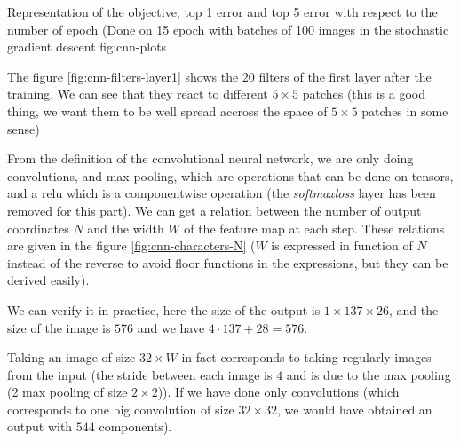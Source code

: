 \documentclass{article}
\begin{document}
\triplefign
{}
{}
{}
{Representation of the objective, top 1 error and top 5 error with
  respect to the number of epoch (Done on 15 epoch with batches of 100
  images in the stochastic gradient descent} {fig:cnn-plots}

\newpage
{}

The figure \ref{fig:cnn-filters-layer1} shows the $20$ filters of the
first layer after the training. We can see that they react to
different $5 \times 5$ patches (this is a good thing, we want them to
be well spread accross the space of $5 \times 5$ patches in some
sense)




From the definition of the convolutional neural network, we are only
doing convolutions, and max pooling, which are operations that can be
done on tensors, and a relu which is a componentwise operation (the
\emph{softmaxloss} layer has been removed for this part). We can get a
relation between the number of output coordinates $N$ and the width
$W$ of the feature map at each step. These relations are given in the
figure \ref{fig:cnn-characters-N} ($W$ is expressed in function of $N$
instead of the reverse to avoid floor functions in the expressions,
but they can be derived easily).

We can verify it in practice, here the size of the output is
$1 \times 137 \times 26$, and the size of the image is $576$ and we
have $4 \cdot 137 + 28 = 576$.


Taking an image of size $32 \times W$ in fact corresponds to taking
regularly images from the input (the stride between each image is $4$
and is due to the max pooling (2 max pooling of size $2 \times 2$)). If
we have done only convolutions (which corresponds to one big
convolution of size $32 \times 32$, we would have obtained an output
with $544$ components).
\end{document}
